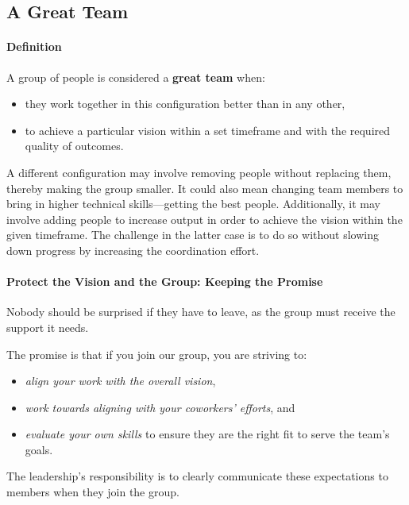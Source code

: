 \subsection{A Great Team} \label{responsibility__great}

\paragraph{Definition}
A group of people is considered a \textbf{great team} when:
\begin{itemize}
	\item they work together in this configuration better than in any other,
	\item to achieve a particular vision within a set timeframe and with the required quality of outcomes.
\end{itemize}

A different configuration may involve removing people without replacing them, thereby making the group smaller. It could also mean changing team members to bring in higher technical skills—getting the best people. Additionally, it may involve adding people to increase output in order to achieve the vision within the given timeframe. The challenge in the latter case is to do so without slowing down progress by increasing the coordination effort.

\paragraph{Protect the Vision and the Group: Keeping the Promise}
\begin{center}
	Nobody should be surprised if they have to leave, as the group must receive the support it needs.
\end{center}
The promise is that if you join our group, you are striving to:
\begin{itemize}
	\item \textit{align your work with the overall vision},
	\item \textit{work towards aligning with your coworkers' efforts}, and
	\item \textit{evaluate your own skills} to ensure they are the right fit to serve the team's goals.
\end{itemize}
The leadership's responsibility is to clearly communicate these expectations to members when they join the group.\\

